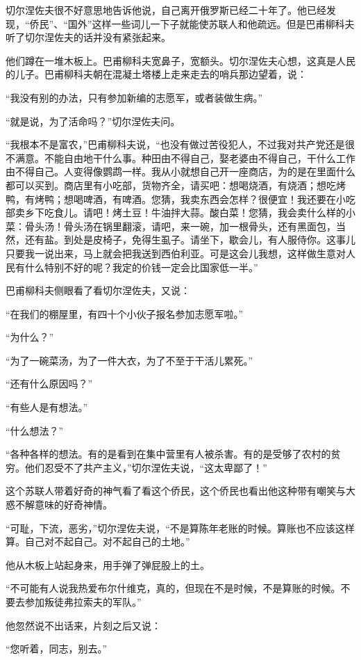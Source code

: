 切尔涅佐夫很不好意思地告诉他说，自己离开俄罗斯已经二十年了。他已经发现，“侨民”、“国外”这样一些词儿一下子就能使苏联人和他疏远。但是巴甫柳科夫听了切尔涅佐夫的话并没有紧张起来。

他们蹲在一堆木板上。巴甫柳科夫宽鼻子，宽额头。切尔涅佐夫心想，这真是人民的儿子。巴甫柳科夫朝在混凝土塔楼上走来走去的哨兵那边望着，说：

“我没有别的办法，只有参加新编的志愿军，或者装做生病。”

“就是说，为了活命吗？”切尔涅佐夫问。

“我根本不是富农，”巴甫柳科夫说，“也没有做过苦役犯人，不过我对共产党还是很不满意。不能自由地干什么事。种田由不得自己，娶老婆由不得自己，干什么工作由不得自己。人变得像鹦鹉一样。我从小就想自己开一座商店，为的是在里面什么都可以买到。商店里有小吃部，货物齐全，请买吧：想喝烧酒，有烧酒；想吃烤鸭，有烤鸭；想喝啤酒，有啤酒。您猜，我卖东西会怎样？很便宜！我还要在小吃部卖乡下吃食儿。请吧！烤土豆！牛油拌大蒜。酸白菜！您猜，我会卖什么样的小菜：骨头汤！骨头汤在锅里翻滚，请吧，来一碗，加一根骨头，还有黑面包，当然，还有盐。到处是皮椅子，免得生虱子。请坐下，歇会儿，有人服侍你。这事儿只要我一说出来，马上就会把我送到西伯利亚。可是这会儿我想，这样做生意对人民有什么特别不好的呢？我定的价钱一定会比国家低一半。”

巴甫柳科夫侧眼看了看切尔涅佐夫，又说：

“在我们的棚屋里，有四十个小伙子报名参加志愿军啦。”

“为什么？”

“为了一碗菜汤，为了一件大衣，为了不至于干活儿累死。”

“还有什么原因吗？”

“有些人是有想法。”

“什么想法？”

“各种各样的想法。有的是看到在集中营里有人被杀害。有的是受够了农村的贫穷。他们忍受不了共产主义，”切尔涅佐夫说，“这太卑鄙了！”

这个苏联人带着好奇的神气看了看这个侨民，这个侨民也看出他这种带有嘲笑与大惑不解意味的好奇神情。

“可耻，下流，恶劣，”切尔涅佐夫说，“不是算陈年老账的时候。算账也不应该这样算。自己对不起自己。对不起自己的土地。”

他从木板上站起身来，用手弹了弹屁股上的土。

“不可能有人说我热爱布尔什维克，真的，但现在不是时候，不是算账的时候。不要去参加叛徒弗拉索夫的军队。”

他忽然说不出话来，片刻之后又说：

“您听着，同志，别去。”

